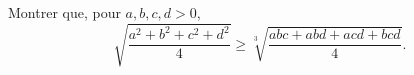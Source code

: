 Montrer que, pour $a, b, c, d > 0$,
\[ \sqrt{\frac{a^2 + b^2 + c^2 + d^2}{4}} \geq \sqrt[3]{\frac{abc + abd + acd + bcd}{4}}. \]
